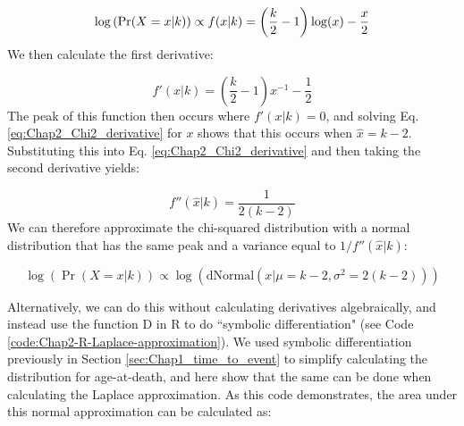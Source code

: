 \begin{equation}
    \log \left(\Pr(X=x | k) \right) \propto f(x|k) \\
                            = \left(\frac{k}{2}-1\right) \log(x) - \frac{x}{2}
\end{equation}
We then calculate the first derivative:

\begin{equation} \label{eq:Chap2_Chi2_derivative}
    f'(x|k) = \left(\frac{k}{2}-1\right)x^{-1} - \frac{1}{2}
\end{equation}
The peak of this function then occurs where  \( f'(x|k)=0 \), and solving Eq. \ref{eq:Chap2_Chi2_derivative} for \(x\) shows that this occurs when \(\hat{x}=k-2\).  Substituting this into Eq. \ref{eq:Chap2_Chi2_derivative} and then taking the second derivative yields:

\begin{equation}
    f''(\hat{x}|k) = \frac{1}{2(k-2)}
\end{equation}
We can therefore approximate the chi-squared distribution with a normal distribution that has the same peak and a variance equal to \( 1/f''(\hat{x}|k) \):

\begin{equation}
    \log \left( \Pr(X=x | k) \right) \propto \log \left( \mathrm{dNormal}( x | \mu=k-2, \sigma^2=2(k-2) ) \right)
\end{equation}

Alternatively, we can do this without calculating derivatives algebraically, and instead use the function \colorbox{backcolour}{D} in R to do ``symbolic differentiation" (see Code \ref{code:Chap2-R-Laplace-approximation}).  We used symbolic differentiation previously in Section \ref{sec:Chap1_time_to_event} to simplify calculating the distribution for age-at-death, and here show that the same can be done when calculating the Laplace approximation.  As this code demonstrates, the area under this normal approximation can be calculated as:

\lstset{style=Rcode}


